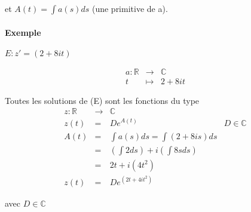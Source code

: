 et $A(t)=\int a(s)ds$ (une primitive de a).

\paragraph{Exemple} $E : z' = (2+8it)$

\[\begin{array}{rcl}
	a : \mathbb{R} & \rightarrow & \mathbb{C}\\
t &\mapsto & 2+8it\end{array}\]

Toutes les solutions de (E) sont les fonctions du type \[\begin{array}{rclr}
z : \mathbb{R} &\rightarrow& \mathbb{C}\\
z(t) &=& De^{A(t)} & D \in \mathbb{C}
\\
A(t) &=& \int a(s) ds = \int (2+8is)ds \\
&=& (\int 2ds) + i(\int 8s ds) \\
&=& 2t + i(4t^2) \\
z(t) &=& De^{(2t +4it^2)}
\end{array}\]

avec $D \in \mathbb{C}$

